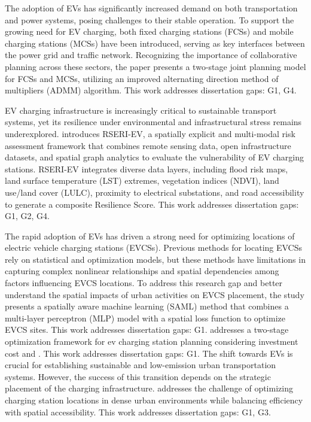 \documentclass[letterpaper, 12pt, oneside, doublespacing]{Thesis}
\begin{document}
\noindent The adoption of EVs has significantly increased demand on both transportation and power systems, posing challenges to their stable operation. To support the growing need for EV charging, both fixed charging stations (FCSs) and mobile charging stations (MCSs) have been introduced, serving as key interfaces between the power grid and traffic network. Recognizing the importance of collaborative planning across these sectors, the paper \cite{a_joint_2025} presents a two-stage joint planning model for FCSs and MCSs, utilizing an improved alternating direction method of multipliers (ADMM) algorithm. This work addresses dissertation gaps: G1, G4.



\noindent EV charging infrastructure is increasingly critical to sustainable transport systems, yet its resilience under environmental and infrastructural stress remains underexplored. \cite{a_multi-modal_2025} introduces RSERI-EV, a spatially explicit and multi-modal risk assessment framework that combines remote sensing data, open infrastructure datasets, and spatial graph analytics to evaluate the vulnerability of EV charging stations. RSERI-EV integrates diverse data layers, including flood risk maps, land surface temperature (LST) extremes, vegetation indices (NDVI), land use/land cover (LULC), proximity to electrical substations, and road accessibility to generate a composite Resilience Score. This work addresses dissertation gaps: G1, G2, G4.



\noindent The rapid adoption of EVs has driven a strong need for optimizing locations of electric vehicle charging stations (EVCSs). Previous methods for locating EVCSs rely on statistical and optimization models, but these methods have limitations in capturing complex nonlinear relationships and spatial dependencies among factors influencing EVCS locations. To address this research gap and better understand the spatial impacts of urban activities on EVCS placement, the study \cite{a_spatially_2025} presents a spatially aware machine learning (SAML) method that combines a multi-layer perceptron (MLP) model with a spatial loss function to optimize EVCS sites. This work addresses dissertation gaps: G1. \cite{a_two-stage_2025} addresses a two-stage optimization framework for ev charging station planning considering investment cost and . This work addresses dissertation gaps: G1. The shift towards EVs is crucial for establishing sustainable and low-emission urban transportation systems. However, the success of this transition depends on the strategic placement of the charging infrastructure. \cite{a_united_2025} addresses the challenge of optimizing charging station locations in dense urban environments while balancing efficiency with spatial accessibility. This work addresses dissertation gaps: G1, G3.
\end{document}
